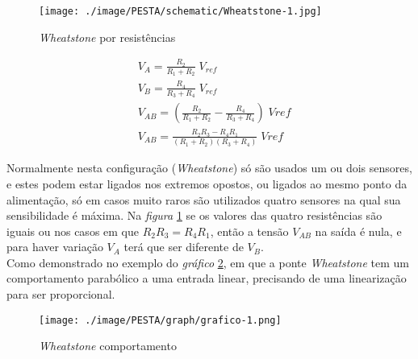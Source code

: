 \begin{minipage}[!b]{.45\linewidth}
	\begin{figure}[H]
		\captionsetup{justification=raggedright,singlelinecheck=false}
		\flushleft
		\texttt{[image: ./image/PESTA/schematic/Wheatstone-1.jpg]}
		\caption{\textit{Wheatstone} por resistências \cite{book-10}}
		\label{wheatstone-2}
	\end{figure}
\end{minipage}
\begin{minipage}[!b]{.5\linewidth}
	\setlength{\jot}{10pt}%
	\small
	\begin{align}
		\label{eq:wheatstone}
		&V_A =  \frac{R_2}{R_1 + R_2} \; V_{ref} \\ &V_B=\frac{R_4}{R_3 + R_4} \; V_{ref} \\
		&V_{AB}= \left(\frac{R_2}{R_1 + R_2} - \frac{R_4}{R_3 + R_4}\right) \; Vref \\
		&V_{AB} = \frac{R_2 R_3 - R_4 R_1}{(R_1 + R_2)(R_3 + R_4)} \; Vref
	\end{align}
\vspace{1pt}
\end{minipage}
Normalmente nesta configuração (\textit{Wheatstone}) só são usados um ou dois sensores, e estes podem estar ligados nos extremos opostos, ou ligados ao mesmo ponto da alimentação, só em casos muito raros são utilizados quatro sensores na qual sua sensibilidade é máxima. Na \textit{figura} \ref{wheatstone-2} se os valores das quatro resistências são iguais ou nos casos em que $R_2 R_3 = R_4 R_1$, então a tensão $V_{AB}$ na saída é nula, e para haver variação $V_A$ terá que ser diferente de $V_B$.
\\
Como demonstrado no exemplo do \textit{gráfico} \ref{wheatstone-reaction}, em que a ponte \textit{Wheatstone} tem um comportamento parabólico a uma entrada linear, precisando de uma linearização para ser proporcional.
\\
\begin{minipage}[!b]{\linewidth}
	\begin{figure}[H]
		\centering
		\texttt{[image: ./image/PESTA/graph/grafico-1.png]}
		\caption{\textit{Wheatstone} comportamento}
		\label{wheatstone-reaction}
	\end{figure}
\end{minipage}
